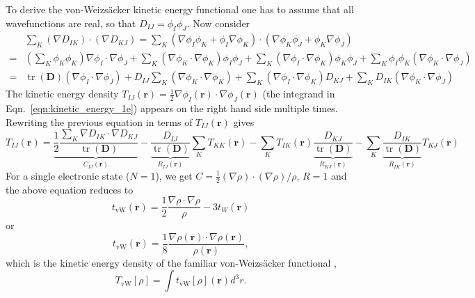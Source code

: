 \documentclass[journal=jpca,manuscript=article,layout=singlecolumn]{achemso}
\DeclareMathOperator{\tr}{tr}
\newcommand\m[1]{\mathbf{#1}}
\renewcommand\vec[1]{\mathbf{#1}}
\begin{document}
To derive the von-Weizs\"{a}cker kinetic energy functional one has to assume that all wavefunctions are real, so that $D_{IJ} = \phi_I \phi_J$.
Now consider
\begin{equation}
\begin{split}
  & \sum_K (\nabla D_{IK}) \cdot (\nabla D_{KJ})
  = \sum_K (\nabla \phi_I \phi_K + \phi_I \nabla \phi_K)\cdot (\nabla \phi_K \phi_J + \phi_K \nabla \phi_J) \\
  =&
  (\sum_K \phi_K \phi_K) \nabla \phi_I \cdot \nabla \phi_J +
  \sum_K (\nabla \phi_K \cdot \nabla \phi_K) \phi_I \phi_J +
  \sum_K (\nabla \phi_I \cdot \nabla \phi_K) \phi_K \phi_J +
  \sum_K \phi_I \phi_K (\nabla \phi_K \cdot  \nabla \phi_J) \\
  =& \tr(\m{D}) (\nabla \phi_I \cdot \nabla \phi_J) + D_{IJ} \sum_{K} (\nabla \phi_K \cdot \nabla \phi_K) + \sum_K (\nabla \phi_I \cdot \nabla \phi_K) D_{KJ}
  + \sum_K D_{IK} (\nabla \phi_K \cdot \nabla \phi_J)
\end{split}
\end{equation}
The kinetic energy density $T_{IJ}(\vec{r}) = \frac{1}{2} \nabla \phi_I(\vec{r}) \cdot \nabla \phi_J(\vec{r})$ (the integrand in Eqn.~\ref{eqn:kinetic_energy_1e}) appears on the right hand side multiple times. Rewriting the previous equation in terms of $T_{IJ}(\vec{r})$ gives
\begin{equation}
T_{IJ}(\vec{r}) = \underbrace{\frac{1}{2} \frac{\sum_K \nabla D_{IK} \cdot \nabla D_{KJ}}{\tr(\m{D})}}_{C_{IJ}(\vec{r})} - \underbrace{\frac{D_{IJ}}{\tr(\m{D})}}_{R_{IJ}(\vec{r})} \sum_K T_{KK}(\vec{r}) - \sum_{K} T_{IK}(\vec{r}) \underbrace{\frac{D_{KJ}}{\tr(\m{D})}}_{R_{KJ}(\vec{r})} - \sum_{K} \underbrace{\frac{D_{IK}}{\tr(\m{D})}}_{R_{IK}(\vec{r})} T_{KJ}(\vec{r}) \label{eqn:kinetic_density_multistate}
\end{equation}
For a single electronic state ($N=1$), we get $C = \frac{1}{2} (\nabla \rho)\cdot (\nabla \rho) / \rho$, $R = 1$ and the above equation reduces to
\begin{equation}
t_{\text{vW}}(\vec{r}) = \frac{1}{2} \frac{\nabla \rho \cdot \nabla \rho}{\rho} - 3 t_W(\vec{r})
\end{equation}
or
\begin{equation}
t_{\text{vW}}(\vec{r}) = \frac{1}{8} \frac{\nabla \rho(\vec{r}) \cdot \nabla \rho(\vec{r})}{\rho(\vec{r})}, \label{eqn:von_Weizsaecker_ked}
\end{equation}
which is the kinetic energy density of the familiar von-Weizs\"{a}cker functional \cite{Weizsacker1935},
\begin{equation}
  T_{\text{vW}}[\rho] = \int t_{\text{vW}}[\rho](\vec{r}) d^3\!r  \label{eqn:von_Weizsaecker_functional}.
\end{equation}
\end{document}
